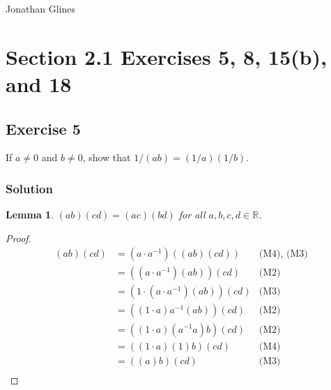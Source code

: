 \documentclass[12pt]{article}
\newtheorem{lem}{Lemma}
\begin{document}
\begin{flushright}
\Large{Jonathan Glines}
\end{flushright}
\section*{Section 2.1 Exercises 5, 8, 15(b), and 18}
\subsection*{Exercise 5}
If $a \ne 0$ and $b \ne 0$, show that $1/\left(ab\right) = \left(1/a\right)\left(1/b\right)$.


\subsubsection*{Solution}
\begin{lem}
$\left(ab\right)\left(cd\right) = \left(ac\right)\left(bd\right)$ for all $a, b, c, d \in \mathbb{R}$.
\end{lem}

\begin{proof}
\begin{align*}
\left(ab\right)\left(cd\right) &= \left(a \cdot a^{-1}\right) \left(\left(ab\right)\left(cd\right)\right) & \text{(M4), (M3)}\\
&= \left(\left(a \cdot a^{-1}\right) \left(ab\right)\right)\left(cd\right) & \text{(M2)}\\
&= \left(1 \cdot \left(a \cdot a^{-1}\right) \left(ab\right)\right)\left(cd\right) & \text{(M3)}\\
&= \left(\left(1 \cdot a\right) a^{-1} \left(ab\right)\right)\left(cd\right) & \text{(M2)}\\
&= \left(\left(1 \cdot a\right) \left(a^{-1} a\right)b\right)\left(cd\right) & \text{(M2)}\\
&= \left(\left(1 \cdot a\right) \left(1\right)b\right)\left(cd\right) & \text{(M4)}\\
&= \left(\left(a\right) b\right)\left(cd\right) & \text{(M3)}\\
\end{align*}
\end{proof}
\end{document}
